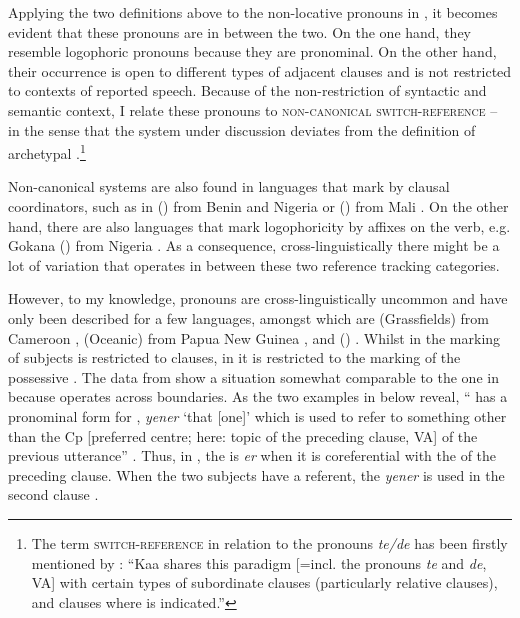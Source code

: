 \documentclass[output=paper
,newtxmath
,modfonts
,nonflat]{langsci/langscibook}
\begin{document}
Applying the two definitions above to the non-locative   pronouns in , it becomes evident that these pronouns are in between the two. On the one hand, they resemble logophoric pronouns because they are pronominal. On the other hand, their occurrence is open to different types of adjacent clauses and is not restricted to contexts of reported speech. Because of the non-restriction of syntactic and semantic context, I relate these pronouns to \textsc{non-canonical switch-reference} -- in the sense that the system under discussion deviates from the definition of archetypal .\footnote{The term \textsc{switch-reference} in relation to the pronouns \textit{te/de} has been firstly mentioned by \citet{Neely2013}: “Kaa shares this paradigm [=incl. the  pronouns \textit{te} and \textit{de}, VA] with certain types of subordinate clauses (particularly relative clauses), and clauses where  is indicated.”} 

Non-canonical systems are also found in languages that mark  by clausal coordinators, such as in  () from Benin and Nigeria \citep[113f]{LefebvreBrousseau02} or  () from Mali \citep[602ff]{Carlson1994}. On the other hand, there are also languages that mark logophoricity by affixes on the verb, e.g. Gokana () from Nigeria \citep{HymanComrie81}. As a consequence, cross-linguistically there might be a lot of variation that operates in between these two reference tracking categories.

However, to my knowledge,  pronouns are cross-linguistically uncommon and have only been described for a few languages, amongst which are  (Grassfields) from Cameroon \citep[53]{Wiesemann82},  (Oceanic) from Papua New Guinea \citep[391]{Crowleyetal11}, and  () \citep[311]{Prince2006}. Whilst in  the  marking of subjects is restricted to  clauses, in  it is restricted to the marking of the possessive . The data from  show a situation somewhat comparable to the one in  because  operates across  boundaries. As the two examples in  below reveal, “ has a pronominal form for , \textit{yener} ‘that [one]’ which is used to refer to something other than the Cp [preferred centre; here: topic of the preceding clause, VA] of the previous utterance” \citep[311]{Prince2006}. Thus, in , the  is \textit{er} when it is coreferential with the  of the preceding clause. When the two subjects have a  referent, the  \textit{yener} is used in the second clause .
\end{document}
